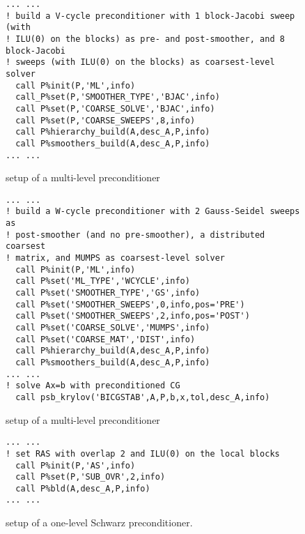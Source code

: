 \begin{figure}[tbh]
\begin{center}
\begin{minipage}{.90\textwidth} 
{\small
\begin{verbatim}
... ...
! build a V-cycle preconditioner with 1 block-Jacobi sweep (with 
! ILU(0) on the blocks) as pre- and post-smoother, and 8  block-Jacobi
! sweeps (with ILU(0) on the blocks) as coarsest-level solver
  call P%init(P,'ML',info)
  call_P%set(P,'SMOOTHER_TYPE','BJAC',info)
  call P%set(P,'COARSE_SOLVE','BJAC',info)
  call P%set(P,'COARSE_SWEEPS',8,info)
  call P%hierarchy_build(A,desc_A,P,info)
  call P%smoothers_build(A,desc_A,P,info)
... ...
\end{verbatim}
}
\end{minipage}

\caption{setup of a multi-level preconditioner\label{fig:ex2}}
\end{center}
\end{figure}

\begin{figure}[h!]
\begin{center}
\begin{minipage}{.90\textwidth} 
{\small
\begin{verbatim}
... ...
! build a W-cycle preconditioner with 2 Gauss-Seidel sweeps as 
! post-smoother (and no pre-smoother), a distributed coarsest
! matrix, and MUMPS as coarsest-level solver
  call P%init(P,'ML',info)
  call P%set('ML_TYPE','WCYCLE',info)
  call P%set('SMOOTHER_TYPE','GS',info)
  call P%set('SMOOTHER_SWEEPS',0,info,pos='PRE')
  call P%set('SMOOTHER_SWEEPS',2,info,pos='POST')
  call P%set('COARSE_SOLVE','MUMPS',info)
  call P%set('COARSE_MAT','DIST',info)
  call P%hierarchy_build(A,desc_A,P,info)
  call P%smoothers_build(A,desc_A,P,info)
... ...
! solve Ax=b with preconditioned CG
  call psb_krylov('BICGSTAB',A,P,b,x,tol,desc_A,info)
\end{verbatim}
}
\end{minipage}
\caption{setup of a multi-level preconditioner\label{fig:ex3}}
\end{center}
\end{figure}

\begin{figure}[h!]
\begin{center}
\begin{minipage}{.90\textwidth} 
{\small
\begin{verbatim}
... ...
! set RAS with overlap 2 and ILU(0) on the local blocks
  call P%init(P,'AS',info)
  call P%set(P,'SUB_OVR',2,info)
  call P%bld(A,desc_A,P,info)
... ...
\end{verbatim}
}
\end{minipage}
\caption{setup of a one-level Schwarz preconditioner.\label{fig:ex4}}
\end{center}
\end{figure}


